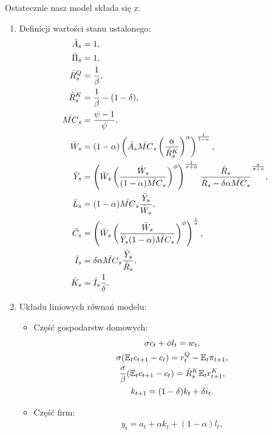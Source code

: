 Ostatecznie nasz model składa się z:
\begin{enumerate}
    \item Definicji wartości stanu ustalonego:
        \begin{align}
                \bar{A}_s &= 1, \\
                \bar{\Pi}_s &= 1, \\
                \bar{R}_s^Q &= \frac{1}{\beta}, \\
                \bar{R}_s^K &= \frac{1}{\beta} - (1 - \delta), \\
                \bar{MC}_s &= \frac{\psi - 1}{\psi}, \\
                \bar{W}_s &= (1-\alpha)\left(\bar{A}_s \bar{MC}_s \left(\frac{\alpha}{\bar{R}_s^{K}}\right)^\alpha\right)^{\frac{1}{1-\alpha}}, \\
                \bar{Y}_s &= \left( \bar{W}_s \left( \frac{\bar{W}_s}{(1-\alpha)\bar{MC}_s}\right)^\phi\right)^{\frac{1}{\sigma + \phi}} \frac{\bar{R}_s}{\bar{R}_s - \delta \alpha \bar{MC}_s}^{\frac{\sigma}{\sigma + \phi}}, \\
                \bar{L}_s &= (1-\alpha)\bar{MC}_s\frac{\bar{Y}_s}{\bar{W}_s}, \\
                \bar{C}_s &= \left( \bar{W}_s \left( \frac{\bar{W}_s}{\bar{Y}_s(1-\alpha)\bar{MC}_s}\right)^\phi\right)^{\frac{1}{\sigma}}, \\
                \bar{I}_s &= \delta \alpha \bar{MC}_s \frac{\bar{Y}_s}{\bar{R}_s}, \\
                \bar{K}_s &= \bar{I}_s\frac{1}{\delta}.
        \end{align}
    \item Układu liniowych równań modelu:
    \begin{itemize}
        \item Część gospodarstw domowych:
        \begin{gather}
            \sigma c_t + \phi l_t = w_t, \\
            \sigma(\mathbb{E}_t c_{t+1} - c_t) = r^Q_t - \mathbb{E}_t \pi_{t+1}, \\
            \frac{\sigma}{\beta}(\mathbb{E}_t c_{t+1} - c_t) = \bar{R}_s^K \mathbb{E}_t r^K_{t+1}, \\
            k_{t+1} = (1-\delta)k_t + \delta i_t.
        \end{gather} 
        \item Część firm:
        \begin{gather}
            y_t = a_t + \alpha k_t + (1-\alpha) l_t,\\

\end{gather}
\end{itemize}
\end{enumerate}
